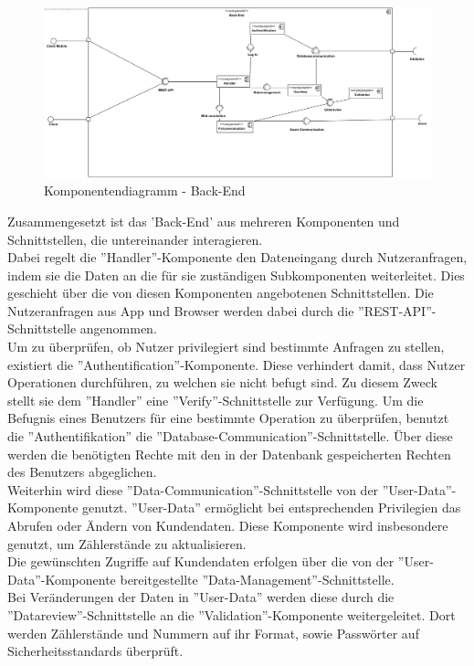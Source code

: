 \begin{figure}[h]
\includegraphics[width=15cm]{img/diagrams/component-back-end}
\caption{Komponentendiagramm - Back-End} 
\end{figure}
Zusammengesetzt ist das 'Back-End' aus mehreren Komponenten und Schnittstellen, die untereinander interagieren.\\
Dabei regelt die ''Handler''-Komponente den Dateneingang durch Nutzeranfragen, indem sie die Daten an die für sie zuständigen Subkomponenten weiterleitet. Dies geschieht über die von diesen Komponenten angebotenen Schnittstellen. Die Nutzeranfragen aus App und Browser werden dabei durch die ''REST-API''-Schnittstelle angenommen.\\
Um zu überprüfen, ob Nutzer privilegiert sind bestimmte Anfragen zu stellen, existiert die ''Authentification''-Komponente. Diese verhindert damit, dass Nutzer Operationen durchführen, zu welchen sie nicht befugt sind. Zu diesem Zweck stellt sie dem ''Handler'' eine ''Verify''-Schnittstelle zur Verfügung. Um die Befugnis eines Benutzers für eine bestimmte Operation zu überprüfen, benutzt die ''Authentifikation'' die ''Database-Communication''-Schnittstelle. Über diese werden die benötigten Rechte mit den in der Datenbank gespeicherten Rechten des Benutzers abgeglichen.\\
Weiterhin wird diese ''Data-Communication''-Schnittstelle von der ''User-Data''-Komponente genutzt. ''User-Data'' ermöglicht bei entsprechenden Privilegien das Abrufen oder Ändern von Kundendaten. Diese Komponente wird insbesondere genutzt, um Zählerstände zu aktualisieren.\\
Die gewünschten Zugriffe auf Kundendaten erfolgen über die von der ''User-Data''-Komponente bereitgestellte ''Data-Management''-Schnittstelle.\\
Bei Veränderungen der Daten in ''User-Data'' werden diese durch die ''Datareview''-Schnittstelle an die ''Validation''-Komponente weitergeleitet. Dort werden Zählerstände und Nummern auf ihr Format, sowie Passwörter auf Sicherheitsstandards überprüft.\\
